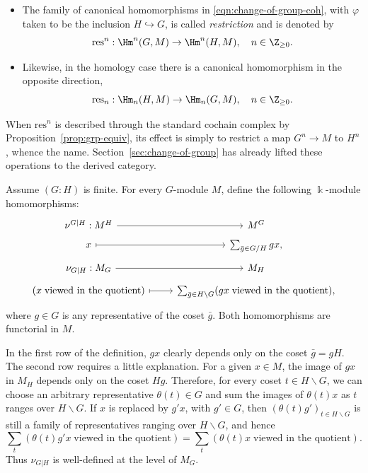 \begin{itemize}
	\item The family of canonical homomorphisms in
	\eqref{eqn:change-of-group-coh}, with $\varphi$ taken to be the inclusion
	$H\hookrightarrow G$, is called \emph{restriction} and is denoted by
	\[ \mathrm{res}^n: \Hm^n(G, M) \to \Hm^n(H, M), \quad n \in \Z_{\geq 0}. \]
	\item Likewise, in the homology case there is a canonical homomorphism in
	the opposite direction,
	\[ \mathrm{res}_n: \Hm_n(H, M) \to \Hm_n(G, M), \quad n \in \Z_{\geq 0}. \]
\end{itemize}
When $\mathrm{res}^n$ is described through the standard cochain complex by
Proposition~\ref{prop:grp-equiv}, its effect is simply to restrict a map
$G^n\to M$ to $H^n$, whence the name. Section~\ref{sec:change-of-group} has
already lifted these operations to the derived category.

\begin{definition}\label{def:cor-zero}
	Assume $(G:H)$ is finite. For every $G$-module $M$, define the following
	$\Bbbk$-module homomorphisms:
	\[\begin{tikzcd}[row sep=tiny]
		\nu^{G|H}: M^H \arrow[r] & M^G \\
		x \arrow[mapsto, r] & \sum_{\bar{g} \in G/H} gx, \\
		\nu_{G|H}: M_G \arrow[r] & M_H \\
		(x\;\text{viewed in the quotient}) \arrow[mapsto, r] & \sum_{\bar{g} \in H \backslash G} (gx\;\text{viewed in the quotient}),
	\end{tikzcd}\]
	where $g\in G$ is any representative of the coset $\bar g$. Both
	homomorphisms are functorial in $M$.
\end{definition}

In the first row of the definition, $gx$ clearly depends only on the coset
$\bar g=gH$. The second row requires a little explanation. For a given
$x\in M$, the image of $gx$ in $M_H$ depends only on the coset $Hg$.
Therefore, for every coset $t\in H\backslash G$, we can choose an arbitrary
representative $\theta(t)\in G$ and sum the images of $\theta(t)x$ as $t$
ranges over $H\backslash G$. If $x$ is replaced by $g'x$, with $g'\in G$,
then $(\theta(t)g')_{t\in H\backslash G}$ is still a family of
representatives ranging over $H\backslash G$, and hence
\[ \sum_t (\theta(t) g' x\;\text{viewed in the quotient}) = \sum_t (\theta(t) x\;\text{viewed in the quotient}). \]
Thus $\nu_{G|H}$ is well-defined at the level of $M_G$.

